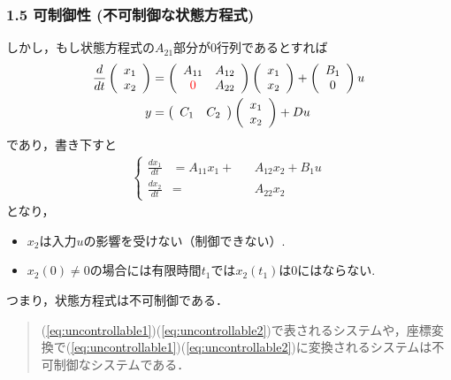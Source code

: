 \documentclass[10pt]{beamer}
\begin{document}
\begin{frame}[t]
\frametitle{1.5 可制御性 (不可制御な状態方程式)}
しかし，もし状態方程式の$A_{21}$部分が$0$行列であるとすれば
\begin{align}
 \frac{d}{dt}
  \left(\begin{array}{c}
         {x}_1 \\
   {x}_2
  \end{array}\right)
  &=
  \left(\begin{array}{cc}
         {A}_{11} & {A}_{12} \\
       \textcolor{red}{0}    & {A}_{22}
  \end{array}\right)
  \left(\begin{array}{c}
         {x}_1 \\
   {x}_2
  \end{array}\right)
  +
  \left(\begin{array}{c}
         {B}_1 \\
   0
  \end{array}\right)
  u
\\
 y &=
  \left(\begin{array}{cc}
         {C}_1 & {C}_2
  \end{array}\right)
  \left(\begin{array}{c}
         {x}_1 \\
   {x}_2
  \end{array}\right)
  + D u
 
\end{align}
であり，書き下すと 
\begin{align}
  \left\{
    \begin{alignedat}{3}
    \frac{d x_1}{dt} &= A_{11} x_1 +&& A_{12}x_2 + B_{1} u\\
    \frac{d x_2}{dt} &= &&A_{22}x_2
    \end{alignedat}
  \right. 
\end{align}
となり，
\begin{itemize}
\item $x_2$は入力$u$の影響を受けない（制御できない）.

\item $x_2(0) \neq 0$の場合には有限時間$t_1$では$x_2(t_1)$は$0$にはならない.

\end{itemize}
つまり，状態方程式は不可制御である．
\begin{quote}
(\ref{eq:uncontrollable1})(\ref{eq:uncontrollable2})で表されるシステムや，座標変換で(\ref{eq:uncontrollable1})(\ref{eq:uncontrollable2})に変換されるシステムは不可制御なシステムである．
\end{quote}
\addtocounter{figure}{+1}
\end{frame}
\end{document}
